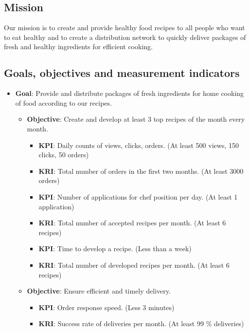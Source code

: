 \documentclass[11pt,a4paper]{article}
\begin{document}
\subsection{Mission}

Our mission is to create and provide healthy food recipes to all people who want to eat healthy and to create a distribution network to quickly deliver packages of fresh and healthy ingredients for efficient cooking.


\subsection{Goals, objectives and measurement indicators}
\begin{itemize}
    \item \textbf{Goal}: Provide and distribute packages of fresh ingredients for home cooking of food according to our recipes.
    \begin{itemize}
        \item \textbf{Objective}: Create and develop at least 3 top recipes of the month every month.
        \begin{itemize}
            \item \textbf{KPI}: Daily counts of views, clicks, orders. (At least 500 views, 150 clicks, 50 orders)
            \item \textbf{KRI}: Total number of orders in the first two months. (At least 3000 orders)
            \item \textbf{KPI}: Number of applications for chef position per day. (At least 1 application)
            \item \textbf{KRI}: Total number of accepted recipes per month. (At least 6 recipes)
            \item \textbf{KPI}: Time to develop a recipe. (Less than a week)
            \item \textbf{KRI}: Total number of developed recipes per month. (At least 6 recipes)
        \end{itemize}
        \item \textbf{Objective}: Ensure efficient and timely delivery.
        \begin{itemize}
            \item \textbf{KPI}: Order response speed. (Less 3 minutes)
            \item \textbf{KRI}: Success rate of deliveries per month. (At least 99 \% deliveries)

\end{itemize}
\end{itemize}
\end{itemize}
\end{document}
